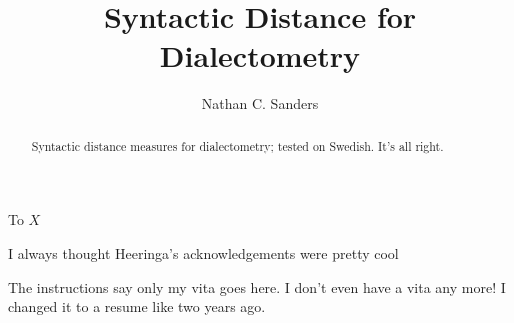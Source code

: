 \documentclass{iuthesis}
\title{Syntactic Distance for Dialectometry}
\author{Nathan C. Sanders}
\begin{document}
\begin{dedication}
  To $X$
\end{dedication}
\begin{acknowledgements}
  I always thought Heeringa's acknowledgements were
  pretty cool
\end{acknowledgements}
\begin{abstract}
  Syntactic distance measures for dialectometry; tested on
  Swedish. It's all right.
\end{abstract}

\frontmatter
\maketitle
\signaturepage
\copyrightpage
\makededication
\makeack
\makeabstract
\tableofcontents
\mainmatter











\backmatter

The instructions say only my vita goes here. I don't even have a vita
any more! I changed it to a resume like two years ago.



\end{document}
